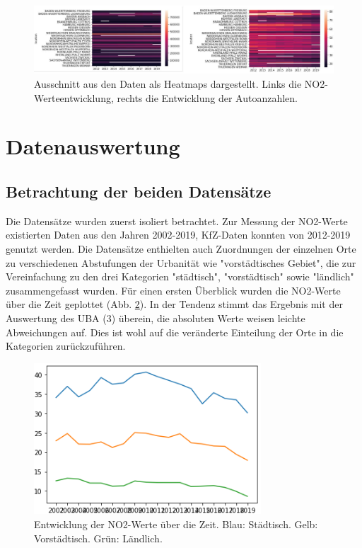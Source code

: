\documentclass[11pt,a4paper,oneside,german]{article}
\begin{document}
	\begin{figure}[h!]
		\centering
		\includegraphics[width=12cm]{Heatmaps.png}
		\caption{Ausschnitt aus den Daten als Heatmaps dargestellt. Links die NO2-Werteentwicklung, rechts die Entwicklung der Autoanzahlen.}
		\label{fig:Heatmaps}
	\end{figure}
	
	\section{Datenauswertung}
	
	\subsection{Betrachtung der beiden Datensätze}
	
	Die Datensätze wurden zuerst isoliert betrachtet. Zur Messung der NO2-Werte existierten Daten aus den Jahren 2002-2019, KfZ-Daten konnten von 2012-2019 genutzt werden. Die  Datensätze enthielten auch Zuordnungen der einzelnen Orte zu verschiedenen Abstufungen der Urbanität wie "vorstädtisches Gebiet", die zur Vereinfachung zu den drei Kategorien "städtisch", "vorstädtisch" sowie "ländlich" zusammengefasst wurden. Für einen ersten Überblick wurden die NO2-Werte über die Zeit geplottet (Abb. \ref{fig:NO2Entwicklung}). In der Tendenz stimmt das Ergebnis mit der Auswertung des UBA (3) überein, die absoluten Werte weisen leichte Abweichungen auf. Dies ist wohl auf die veränderte Einteilung der Orte in die Kategorien zurückzuführen.\\
	
	\begin{figure}[h!]
		\centering
		\includegraphics[width=8.5cm]{NO2Entwicklung.png}
		\caption{Entwicklung der NO2-Werte über die Zeit. Blau: Städtisch. Gelb: Vorstädtisch. Grün: Ländlich.}
		\label{fig:NO2Entwicklung}
	\end{figure}
	
\end{document}
